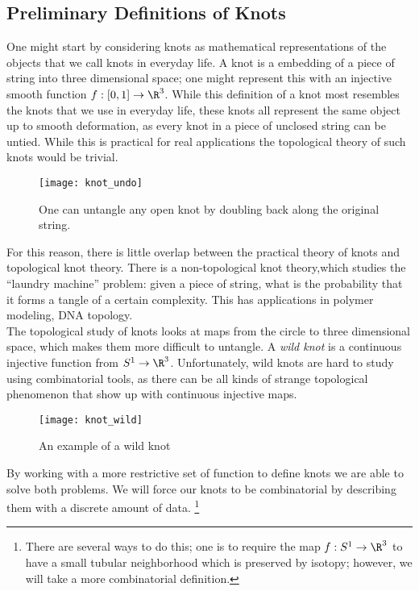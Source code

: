 \subsection{Preliminary Definitions of Knots}
One might start by considering knots as mathematical representations of the objects that we call knots in everyday life. A knot is a embedding of a piece of string into three dimensional space; one might represent this with an injective smooth function $f: [0, 1]\to \R^3$. While this definition of a knot most resembles the knots that we use in everyday life, these knots all represent the same object up to smooth deformation, as every knot in a piece of unclosed string can be untied. While this is practical for real applications the topological theory of such knots would be trivial. 
\begin{wrapfigure}{r}{4cm}
\centering
\texttt{[image: knot\_undo]}
\caption{One can untangle any open knot by doubling back along the original string.}
\end{wrapfigure} 
For this reason, there is little overlap between the practical theory of knots and topological knot theory. There is a non-topological knot theory,\project which studies the ``laundry machine'' problem: given a piece of string, what is the probability that it forms a tangle of a certain complexity. This has applications in polymer modeling, DNA topology. \label{proj:knottangle} \\
The topological study of knots looks at maps from the circle to three dimensional space, which makes them more difficult to untangle. A  \emph{wild knot} is a continuous injective function from $S^1\to \R^3$.  Unfortunately, wild knots are hard to study using combinatorial tools, as there can be all kinds of strange topological phenomenon that show up with continuous injective maps.  
\begin{figure}
\centering
\texttt{[image: knot\_wild]}
\caption{An example of a wild knot}
\label{fig:knot:wild}
\end{figure}
By working with a more restrictive set of function to define  knots we are able to solve both problems. We will force our knots to be combinatorial by describing them with a discrete amount of data.   \footnote{There are several ways to do this; one is to require the map $f: S^1\to \R^3$ to have a small tubular neighborhood which is preserved by isotopy; however, we will take a more combinatorial definition.}\\


